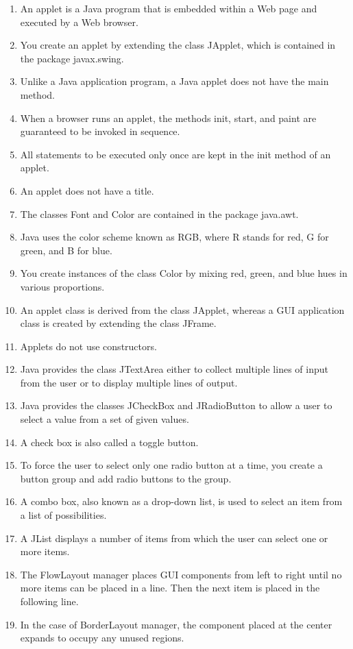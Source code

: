 \documentclass[12pt,a4paper,final,twoside,onecolumn,titlepage]{book}
\begin{document}
\begin{enumerate}
\item An applet is a Java program that is embedded within a Web page and executed by a Web browser.
\item You create an applet by extending the class JApplet, which is contained in the package javax.swing.
\item Unlike a Java application program, a Java applet does not have the main method.
\item When a browser runs an applet, the methods init, start, and paint are guaranteed to be invoked in sequence.
\item All statements to be executed only once are kept in the init method of an applet.
\item An applet does not have a title.
\item The classes Font and Color are contained in the package java.awt.
\item Java uses the color scheme known as RGB, where R stands for red, G for green, and B for blue.
\item You create instances of the class Color by mixing red, green, and blue hues in various proportions.
\item An applet class is derived from the class JApplet, whereas a GUI application class is created by extending the class JFrame.
\item Applets do not use constructors.
\item Java provides the class JTextArea either to collect multiple lines of input from the user or to display multiple lines of output.
\item Java provides the classes JCheckBox and JRadioButton to allow a user to select a value from a set of given values.
\item A check box is also called a toggle button.
\item To force the user to select only one radio button at a time, you create a button group and add radio buttons to the group.
\item A combo box, also known as a drop-down list, is used to select an item from a list of possibilities.
\item A JList displays a number of items from which the user can select one or more items.
\item The FlowLayout manager places GUI components from left to right until no more items can be placed in a line. Then the next item is placed in the following line.
\item In the case of BorderLayout manager, the component placed at the center expands to occupy any unused regions.

\end{enumerate}
\end{document}
